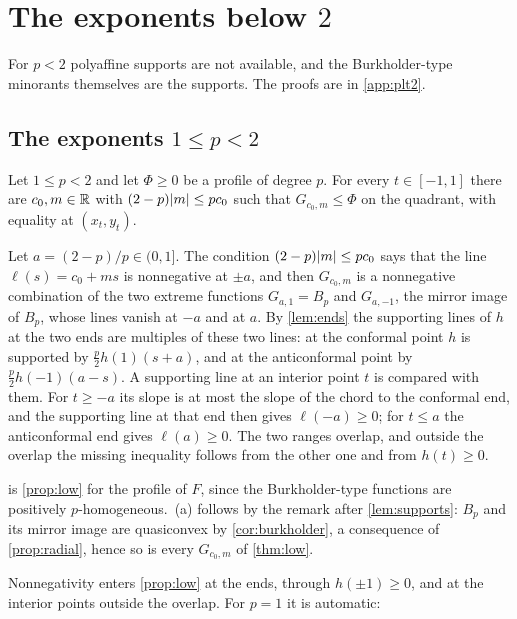 \section{The exponents below \texorpdfstring{$2$}{2}}\label{sec:plt2}

For $p<2$ polyaffine supports are not available, and the Burkholder-type minorants themselves
are the supports. The proofs are in \cref{app:plt2}.

\subsection{The exponents \texorpdfstring{$1\le p<2$}{1 <= p < 2}}

\begin{proposition}\label{prop:low}
Let $1\le p<2$ and let $\Phi\ge0$ be a profile of degree $p$. For every $t\in[-1,1]$ there are
$c_0,m\in\mathbb{R}$ with $(2-p)\lvert m\rvert\le pc_0$ such that $G_{c_0,m}\le\Phi$ on the quadrant, with
equality at $(x_t,y_t)$.
\end{proposition}

Let $a=(2-p)/p\in(0,1]$. The condition $(2-p)\lvert m\rvert\le pc_0$ says that the line
$\ell(s)=c_0+ms$ is nonnegative at $\pm a$, and then $G_{c_0,m}$ is a nonnegative combination of
the two extreme functions $G_{a,1}=B_p$ and $G_{a,-1}$, the mirror image of $B_p$, whose lines
vanish at $-a$ and at $a$. By \cref{lem:ends} the supporting lines of $h$ at the two ends are
multiples of these two lines: at the conformal point $h$ is supported by
$\tfrac p2h(1)(s+a)$, and at the anticonformal point by $\tfrac p2h(-1)(a-s)$. A supporting
line at an interior point $t$ is compared with them. For $t\ge-a$ its slope is at most the slope
of the chord to the conformal end, and the supporting line at that end then gives
$\ell(-a)\ge0$; for $t\le a$ the anticonformal end gives $\ell(a)\ge0$. The two ranges overlap,
and outside the overlap the missing inequality follows from the other one and from $h(t)\ge0$.

 is \cref{prop:low} for the profile of $F$, since the Burkholder-type functions
are positively $p$-homogeneous. \,(a) follows by the remark after
\cref{lem:supports}: $B_p$ and its mirror image are quasiconvex by \cref{cor:burkholder}, a
consequence of \cref{prop:radial}, hence so is every $G_{c_0,m}$ of \cref{thm:low}.

Nonnegativity enters \cref{prop:low} at the ends, through $h(\pm1)\ge0$, and at the interior
points outside the overlap. For $p=1$ it is automatic:

